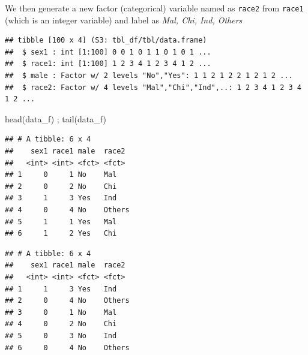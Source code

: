\documentclass[
]{book}
\makeatletter
\newenvironment{Shaded}{\begin{snugshade}}{\end{snugshade}}
\newcommand{\AttributeTok}[1]{\textcolor[rgb]{0.61,0.61,0.61}{#1}}
\newcommand{\FunctionTok}[1]{\textcolor[rgb]{0,0,0}{#1}}
\newcommand{\NormalTok}[1]{#1}
\newcommand{\OtherTok}[1]{\textcolor[rgb]{0.37,0.37,0.37}{#1}}
\newcommand{\SpecialCharTok}[1]{\textcolor[rgb]{0,0,0}{#1}}
\newcommand{\StringTok}[1]{\textcolor[rgb]{0.5,0.5,0.5}{#1}}
\newenvironment{kframe}{%
\medskip{}
\setlength{\fboxsep}{.8em}
 \def\at@end@of@kframe{}%
 \ifinner\ifhmode%
  \def\at@end@of@kframe{\end{minipage}}%
  \begin{minipage}{\columnwidth}%
 \fi\fi%
 \def\FrameCommand##1{\hskip\@totalleftmargin \hskip-\fboxsep
 \colorbox{shadecolor}{##1}\hskip-\fboxsep
     \hskip-\linewidth \hskip-\@totalleftmargin \hskip\columnwidth}%
 \MakeFramed {\advance\hsize-\width
   \@totalleftmargin\z@ \linewidth\hsize
   \@setminipage}}%
 {\par\unskip\endMakeFramed%
 \at@end@of@kframe}
\renewenvironment{Shaded}{\begin{kframe}}{\end{kframe}}
\makeatother
\begin{document}
We then generate a new factor (categorical) variable named as \texttt{race2} from \texttt{race1} (which is an integer variable) and label as \emph{Mal, Chi, Ind, Others}

\begin{Shaded}
\end{Shaded}

\begin{verbatim}
## tibble [100 x 4] (S3: tbl_df/tbl/data.frame)
##  $ sex1 : int [1:100] 0 0 1 0 1 1 0 1 0 1 ...
##  $ race1: int [1:100] 1 2 3 4 1 2 3 4 1 2 ...
##  $ male : Factor w/ 2 levels "No","Yes": 1 1 2 1 2 2 1 2 1 2 ...
##  $ race2: Factor w/ 4 levels "Mal","Chi","Ind",..: 1 2 3 4 1 2 3 4 1 2 ...
\end{verbatim}

\begin{Shaded}
\begin{Highlighting}[]
\FunctionTok{head}\NormalTok{(data\_f) ; }\FunctionTok{tail}\NormalTok{(data\_f)}
\end{Highlighting}
\end{Shaded}

\begin{verbatim}
## # A tibble: 6 x 4
##    sex1 race1 male  race2 
##   <int> <int> <fct> <fct> 
## 1     0     1 No    Mal   
## 2     0     2 No    Chi   
## 3     1     3 Yes   Ind   
## 4     0     4 No    Others
## 5     1     1 Yes   Mal   
## 6     1     2 Yes   Chi
\end{verbatim}

\begin{verbatim}
## # A tibble: 6 x 4
##    sex1 race1 male  race2 
##   <int> <int> <fct> <fct> 
## 1     1     3 Yes   Ind   
## 2     0     4 No    Others
## 3     0     1 No    Mal   
## 4     0     2 No    Chi   
## 5     0     3 No    Ind   
## 6     0     4 No    Others
\end{verbatim}
\end{document}
